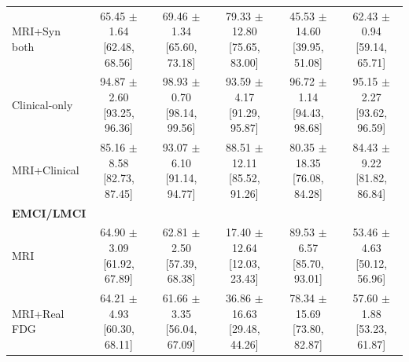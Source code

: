 \begin{landscape}
\begin{longtable}{lccccc}
MRI+Syn both & \shortstack{65.45 $\pm$ 1.64\\{}[62.48, 68.56]} & \shortstack{69.46 $\pm$ 1.34\\{}[65.60, 73.18]} & \shortstack{79.33 $\pm$ 12.80\\{}[75.65, 83.00]} & \shortstack{45.53 $\pm$ 14.60\\{}[39.95, 51.08]} & \shortstack{62.43 $\pm$ 0.94\\{}[59.14, 65.71]} \\
Clinical-only & \shortstack{94.87 $\pm$ 2.60\\{}[93.25, 96.36]} & \shortstack{98.93 $\pm$ 0.70\\{}[98.14, 99.56]} & \shortstack{93.59 $\pm$ 4.17\\{}[91.29, 95.87]} & \shortstack{96.72 $\pm$ 1.14\\{}[94.43, 98.68]} & \shortstack{95.15 $\pm$ 2.27\\{}[93.62, 96.59]} \\
MRI+Clinical & \shortstack{85.16 $\pm$ 8.58\\{}[82.73, 87.45]} & \shortstack{93.07 $\pm$ 6.10\\{}[91.14, 94.77]} & \shortstack{88.51 $\pm$ 12.11\\{}[85.52, 91.26]} & \shortstack{80.35 $\pm$ 18.35\\{}[76.08, 84.28]} & \shortstack{84.43 $\pm$ 9.22\\{}[81.82, 86.84]} \\
\midrule
\multicolumn{6}{l}{\textbf{EMCI/LMCI}} \\
MRI & \shortstack{64.90 $\pm$ 3.09\\{}[61.92, 67.89]} & \shortstack{62.81 $\pm$ 2.50\\{}[57.39, 68.38]} & \shortstack{17.40 $\pm$ 12.64\\{}[12.03, 23.43]} & \shortstack{89.53 $\pm$ 6.57\\{}[85.70, 93.01]} & \shortstack{53.46 $\pm$ 4.63\\{}[50.12, 56.96]} \\
MRI+Real FDG & \shortstack{64.21 $\pm$ 4.93\\{}[60.30, 68.11]} & \shortstack{61.66 $\pm$ 3.35\\{}[56.04, 67.09]} & \shortstack{36.86 $\pm$ 16.63\\{}[29.48, 44.26]} & \shortstack{78.34 $\pm$ 15.69\\{}[73.80, 82.87]} & \shortstack{57.60 $\pm$ 1.88\\{}[53.23, 61.87]} \\

\end{longtable}
\end{landscape}
